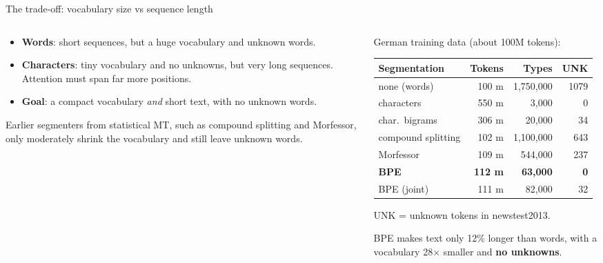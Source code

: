 \documentclass[aspectratio=169,11pt]{beamer}
\begin{document}
\begin{frame}{The trade-off: vocabulary size vs sequence length}
  \begin{columns}[T]
    \begin{column}{0.46\textwidth}
      \small
      \begin{itemize}
        \item \textbf{Words}: short sequences, but a huge vocabulary and unknown words.
        \item \textbf{Characters}: tiny vocabulary and no unknowns, but very long sequences. Attention must span far more positions.
        \item \textbf{Goal}: a compact vocabulary \emph{and} short text, with no unknown words.
      \end{itemize}
      \vspace{1mm}
      Earlier segmenters from statistical MT, such as compound splitting and Morfessor, only moderately shrink the vocabulary and still leave unknown words.
    \end{column}
    \begin{column}{0.5\textwidth}
      \footnotesize
      German training data (about 100M tokens):
      \vspace{1mm}

      \begin{tabular}{@{}lrrr@{}}
        \toprule
        Segmentation & Tokens & Types & UNK\\
        \midrule
        none (words) & 100 m & 1,750,000 & 1079\\
        characters & 550 m & 3,000 & 0\\
        char.\ bigrams & 306 m & 20,000 & 34\\
        compound splitting & 102 m & 1,100,000 & 643\\
        Morfessor & 109 m & 544,000 & 237\\
        \textbf{BPE} & \textbf{112 m} & \textbf{63,000} & \textbf{0}\\
        BPE (joint) & 111 m & 82,000 & 32\\
        \bottomrule
      \end{tabular}
      \vspace{1mm}

      {\scriptsize UNK = unknown tokens in newstest2013.}
      \vspace{1mm}

      BPE makes text only 12\% longer than words, with a vocabulary 28$\times$ smaller and \textbf{no unknowns}.
    \end{column}
  \end{columns}
\end{frame}
\end{document}
